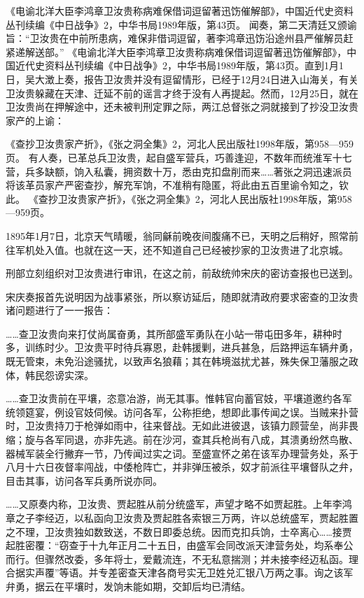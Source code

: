 \documentclass[12pt,UTF8]{ctexbook}
\begin{document}
《电谕北洋大臣李鸿章卫汝贵称病难保借词逗留著迅饬催解部》，中国近代史资料丛刊续编《中日战争》2，中华书局1989年版，第43页。
闻奏，第二天清廷又颁谕旨：“卫汝贵在中前所患病，难保非借词逗留，著李鸿章迅饬沿途州县严催解员赶紧递解送部。” 《电谕北洋大臣李鸿章卫汝贵称病难保借词逗留著迅饬催解部》，中国近代史资料丛刊续编《中日战争》2，中华书局1989年版，第43页。直到1月1日，吴大澂上奏，报告卫汝贵并没有逗留情形，已经于12月24日进入山海关，有关卫汝贵躲藏在天津、迁延不前的谣言才终于没有人再提起。然而，12月25日，就在卫汝贵尚在押解途中，还未被判刑定罪之际，两江总督张之洞就接到了抄没卫汝贵家产的上谕：

《查抄卫汝贵家产折》，《张之洞全集》2，河北人民出版社1998年版，第958—959页。
有人奏，已革总兵卫汝贵，起自盛军营兵，巧善逢迎，不数年而统淮军十七营，兵多缺额，饷入私囊，拥资数十万，悉由克扣盘削而来……著张之洞迅速派员将该革员家产严密查抄，解充军饷，不准稍有隐匿，将此由五百里谕令知之，钦此。 《查抄卫汝贵家产折》，《张之洞全集》2，河北人民出版社1998年版，第958—959页。

1895年1月7日，北京天气晴暖，翁同龢前晚夜间腹痛不已，天明之后稍好，照常前往军机处入值。也就在这一天，还不知道自己已经被抄家的卫汝贵进了北京城。

刑部立刻组织对卫汝贵进行审讯，在这之前，前敌统帅宋庆的密访查报也已送到。

宋庆奏报首先说明因为战事紧张，所以察访延后，随即就清政府要求密查的卫汝贵诸问题进行了一一报告：

……查卫汝贵向来打仗尚属奋勇，其所部盛军勇队在小站一带屯田多年，耕种时多，训练时少。卫汝贵平时待兵寡恩，赴韩援剿，进兵甚急，后路押运车辆弁勇，既无管束，未免沿途骚扰，以致声名狼藉；其在韩境滋扰尤甚，殊失保卫藩服之政体，韩民怨谤实深。

……查卫汝贵前在平壤，恣意冶游，尚无其事。惟韩官向蓄官妓，平壤道邀约各军统领筵宴，例设官妓伺候。访问各军，公称拒绝，想即此事传闻之误。当贼来扑营时，卫汝贵持刀于枪弹如雨中，往来督战。无如此进彼退，该镇力顾营垒，尚非畏缩；旋与各军同退，亦非先逃。前在沙河，查其兵枪尚有八成，其溃勇纷然鸟散、器械军装全行撇弃一节，乃传闻过实之词。至盛宣怀之弟在该军办理营务处，系于八月十六日夜督率闯战，中倭枪阵亡，并非弹压被杀，奴才前派往平壤督队之弁，目击其事，访问各军兵勇所说亦同。

……又原奏内称，卫汝贵、贾起胜从前分统盛军，声望才略不如贾起胜。上年李鸿章之子李经迈，以私函向卫汝贵及贾起胜各索银三万两，许以总统盛军，贾起胜置之不理，卫汝贵独如数致送，不数日即委总统。因而克扣兵饷，士卒离心……接贾起胜密覆：“窃查于十九年正月二十五日，由盛军会同改派天津营务处，均系奉公而行。但骤然改委，多年将士，爱戴流连，不无私意揣测；并未接李经迈私函。理合据实声覆”等语。并专差密查天津各商号实无卫姓兑汇银八万两之事。询之该军弁勇，据云在平壤时，发饷未能如期，交卸后均已清结。
\end{document}
